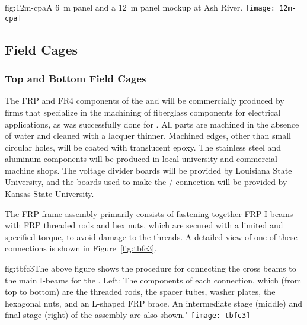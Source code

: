 \begin{dunefigure}{fig:12m-cpa}{A \SI{6}{\m}   panel and a \SI{12}{\m}  panel mockup at Ash River.}
\texttt{[image: 12m-cpa]}
\end{dunefigure}

\subsection{Field Cages}
\label{sec:fdsp-hv-prod-fc}


\subsubsection{Top and Bottom Field Cages}

The FRP and FR4 components of the   and  will be commercially produced by firms that specialize in the machining of fiberglass components for electrical applications, as was successfully done for . All parts are machined in the absence of water and cleaned with a lacquer thinner. Machined edges, other than small circular holes, will be coated with translucent epoxy. The stainless steel and aluminum components will be produced in local university and commercial machine shops. The voltage divider boards will be provided by Louisiana State University, and the boards used to make the / connection will be provided by Kansas State University.

The FRP frame assembly primarily consists of fastening together FRP I-beams with FRP threaded rods and hex nuts, which are secured with a limited and specified torque, to avoid damage to the threads. A detailed view of one of these connections is shown in Figure~\ref{fig:tbfc3}.

\begin{dunefigure}{fig:tbfc3}{The above figure shows the procedure for connecting the cross beams to the main I-beams for the . Left: The components of each connection, which (from top to bottom) are the threaded rods, the spacer tubes, washer plates, the hexagonal nuts, and an L-shaped FRP brace. An intermediate stage (middle) and final stage (right) of the assembly are also shown."}
\texttt{[image: tbfc3]}
\end{dunefigure}

